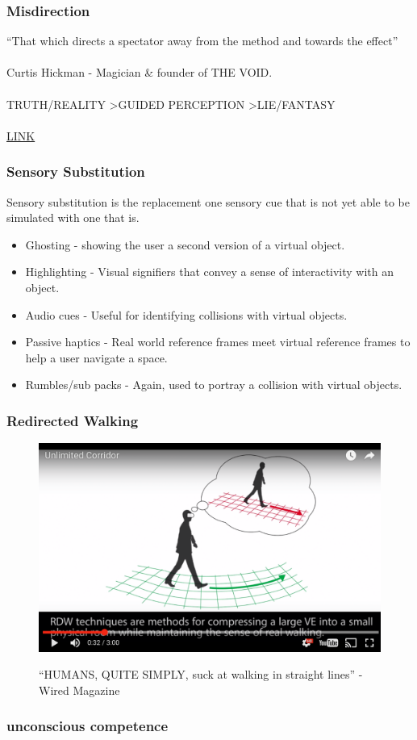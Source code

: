 \begin{frame}
	\frametitle{Misdirection}
	``That which directs a spectator away from the method and towards the effect'' \\~\\
	Curtis Hickman - Magician \& founder of THE VOID. \\~\\
	TRUTH/REALITY \textgreater  GUIDED PERCEPTION \textgreater  LIE/FANTASY \\~\\
	\href{https://www.youtube.com/watch?v=Ebwtq1HZJ2A}{LINK}
\end{frame}


\begin{frame}
	\frametitle{Sensory Substitution}
	Sensory substitution is the replacement one sensory cue that is not yet able to be simulated with one that is. 
	\begin{itemize}
		\item Ghosting - showing the user a second version of a virtual object. 
		\item Highlighting - Visual signifiers that convey a sense of interactivity with an object.
		\item Audio cues - Useful for identifying collisions with virtual objects.  
		\item Passive haptics - Real world reference frames meet virtual reference frames to help a user navigate a space. 
		\item Rumbles/sub packs - Again, used to portray a collision with virtual objects. 
	\end{itemize}
\end{frame}
	
\begin{frame}
	\frametitle{Redirected Walking}
	\begin{figure}
		\href{https://www.youtube.com/watch?v=THk92rev1VA}{ \includegraphics[scale=.2]{assets/directed}  }
		\caption{``HUMANS, QUITE SIMPLY, suck at walking in straight lines'' - Wired Magazine}
	\end{figure}
		
\end{frame}

\begin{frame}
	\frametitle{unconscious competence}
\end{frame}



